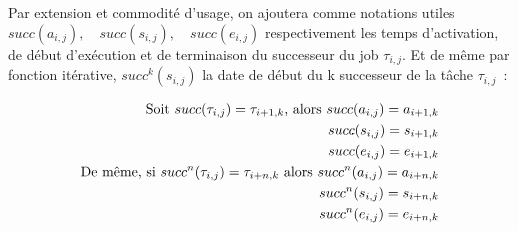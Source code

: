 \documentclass[french, a4paper, 11pt, twoside, pdftex]{StyleThese}
\begin{document}
		Par extension et commodité d'usage, on ajoutera comme notations utiles $succ(a_{i,j}), \quad succ(s_{i,j}), \quad succ(e_{i,j})$ respectivement les temps d'activation, de début d'exécution et de terminaison du successeur du job $\tau_{i,j}$. Et de même par fonction itérative, $succ^k(s_{i,j})$ la date de début du k successeur de la tâche $\tau_{i,j}$~: 
		
		\begin{align*}
		\textup{Soit } succ(\tau_{i,j}) = \tau_{i+1,k} \textup{, alors }
			succ(a_{i,j}) = a_{i+1,k} 	\\
			succ(s_{i,j}) = s_{i+1,k}	\\
			succ(e_{i,j}) = e_{i+1,k}	\\
		\textup{De même, si } succ^n(\tau_{i,j}) = \tau_{i+n,k} \textup{ alors }
			succ^n(a_{i,j}) = a_{i+n,k}		\\
			succ^n(s_{i,j}) = s_{i+n,k}		\\
			succ^n(e_{i,j}) = e_{i+n,k}
		\end{align*}
	    
\end{document}
